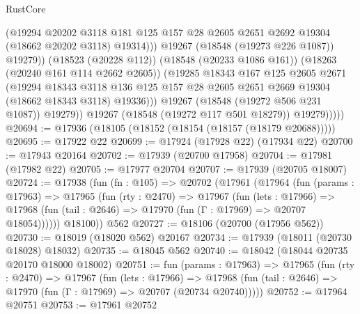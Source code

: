 \begin{lexlean}{RustCore}
\begin{coremodule}
                            (@19294
                              @20202
                              @3118
                              @181
                              @125
                              @157
                              @28
                              @2605
                              @2651
                              @2692
                              @19304
                              (@18662 @20202 @3118)
                              @19314)))
                        @19267
                        (@18548 (@19273 @226 @1087))
                        @19279))
                    (@18523 (@20228 @112))
                    (@18548 (@20233 @1086 @161))
                    (@18263 (@20240 @161 @114 @2662 @2605))
                    (@19285
                      @18343
                      @167
                      @125
                      @2605
                      @2671
                      (@19294
                        @18343
                        @3118
                        @136
                        @125
                        @157
                        @28
                        @2605
                        @2651
                        @2669
                        @19304
                        (@18662 @18343 @3118)
                        @19336)))
                  @19267
                  (@18548 (@19272 @506 @231 @1087))
                  @19279))
              @19267
              (@18548 (@19272 @117 @501 @18279))
              @19279)))))
@20694 := @17936 (@18105 (@18152 (@18154 (@18157 (@18179 @20688)))))
@20695 := @17922 @22
@20699 := @17924 (@17928 @22) (@17934 @22)
@20700 := @17943 @20164
@20702 := @17939 (@20700 @17958)
@20704 := @17981 (@17982 @22)
@20705 := @17977 @20704
@20707 := @17939 (@20705 @18007)
@20724 := @17938
    (fun (fn : @105) =>
    @20702
      (@17961
        (@17964
          (fun (params : @17963) =>
          @17965
            (fun (rty : @2470) =>
            @17967
              (fun (lets : @17966) =>
              @17968 (fun (tail : @2646) => @17970 (fun (Γ : @17969) => @20707 @18054))))))
        @18100))
    @562
@20727 := @18106 (@20700 (@17956 @562))
@20730 := @18019 (@18020 @562) @20167
@20734 := @17939 (@18011 (@20730 @18028) @18032)
@20735 := @18045 @562
@20740 := @18042 (@18044 @20735 @20170 @18000 @18002)
@20751 := fun (params : @17963) =>
  @17965
    (fun (rty : @2470) =>
    @17967
      (fun (lets : @17966) =>
      @17968 (fun (tail : @2646) => @17970 (fun (Γ : @17969) => @20707 (@20734 @20740)))))
@20752 := @17964 @20751
@20753 := @17961 @20752

\end{coremodule}
\end{lexlean}
